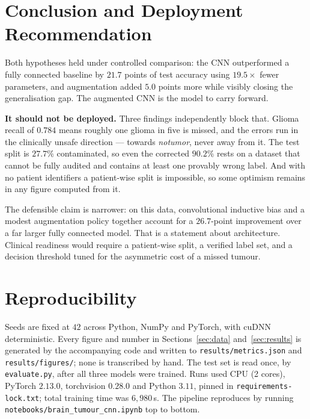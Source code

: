 \documentclass[10pt,a4paper]{article}
\begin{document}
\section{Conclusion and Deployment Recommendation}
\label{sec:conclusion}

Both hypotheses held under controlled comparison: the CNN outperformed a fully
connected baseline by $21.7$ points of test accuracy using $19.5\times$ fewer
parameters, and augmentation added $5.0$ points more while visibly closing the
generalisation gap. The augmented CNN is the model to carry forward.

\textbf{It should not be deployed.} Three findings independently block that.
Glioma recall of $0.784$ means roughly one glioma in five is missed, and the
errors run in the clinically unsafe direction --- towards \emph{notumor}, never
away from it. The test split is $27.7\%$ contaminated, so even the corrected
$90.2\%$ rests on a dataset that cannot be fully audited and contains at least
one provably wrong label. And with no patient identifiers a patient-wise split
is impossible, so some optimism remains in any figure computed from it.

The defensible claim is narrower: on this data, convolutional inductive bias and
a modest augmentation policy together account for a $26.7$-point improvement
over a far larger fully connected model. That is a statement about architecture.
Clinical readiness would require a patient-wise split, a verified label set, and
a decision threshold tuned for the asymmetric cost of a missed tumour.

\enlargethispage{3.5\baselineskip}
\section*{Reproducibility}

\small
Seeds are fixed at $42$ across Python, NumPy and PyTorch, with cuDNN
deterministic. Every figure and number in Sections~\ref{sec:data}
and~\ref{sec:results} is generated by the accompanying code and written to
\texttt{results/metrics.json} and \texttt{results/figures/}; none is transcribed
by hand. The test set is read once, by \texttt{evaluate.py}, after all three
models were trained. Runs used CPU (2 cores), PyTorch $2.13.0$, torchvision
$0.28.0$ and Python $3.11$, pinned in \texttt{requirements-lock.txt}; total
training time was $6{,}980$\,s. The pipeline reproduces by running
\texttt{notebooks/brain\_tumour\_cnn.ipynb} top to bottom.
\normalsize
\end{document}
